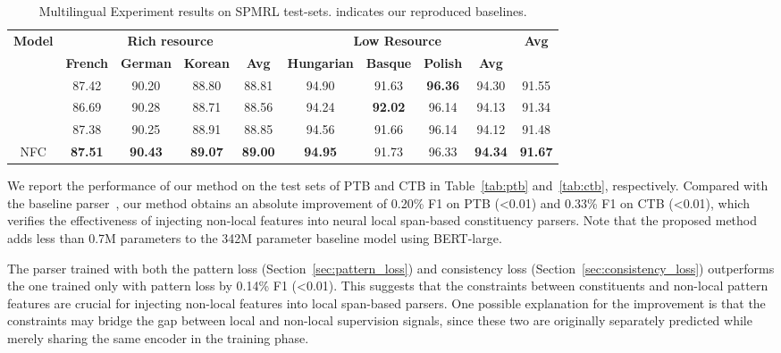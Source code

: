 \documentclass[11pt]{article}
\begin{document}
\begin{table*}[t!]
    \begin{center}
            \small
    \begin{tabular}{c|ccc|c|ccc|c|c}
        \hline
        \multirow{2}{*}{\bf Model} & \multicolumn{4}{c|}{\bf Rich resource} & \multicolumn{4}{c|}{\bf Low Resource} & \multirow{2}{*}{\bf Avg} \\
       \cline{2-9}
        & \bf French & \bf German & \bf Korean & \bf Avg & \bf Hungarian & \bf Basque & \bf Polish & \bf Avg & \\
        \hline
        \citet{san-constituency} & 87.42 & 90.20 & 88.80 & 88.81 & 94.90 & 91.63 & \bf 96.36 & 94.30 & 91.55 \\
         \citet{constituency-point} & 86.69 & 90.28 & 88.71 & 88.56 & 94.24  & \bf 92.02 & 96.14 & 94.13 & 91.34 \\
         \hline
        \citet{san-constituency}  & 87.38 & 90.25 & 88.91 & 88.85 & 94.56 & 91.66 & 96.14 & 94.12 & 91.48 \\
         NFC & \bf 87.51 & \bf 90.43 & \bf 89.07 & \bf 89.00 & \bf 94.95 & 91.73 & 96.33 & {\bf 94.34} &{\bf 91.67} \\
        \hline
    \end{tabular}
    \end{center}
    \caption{Multilingual Experiment results on SPMRL test-sets.  indicates our reproduced baselines.}
    \label{tab:multi-lingual}
\end{table*}


We report the performance of our method on the test sets of PTB and CTB in Table~\ref{tab:ptb} and~\ref{tab:ctb}, respectively. 
Compared with the baseline parser~\cite{san-constituency}, our method obtains an absolute improvement of 0.20\% F1 on PTB (\textless0.01) and 0.33\% F1 on CTB (\textless0.01), 
which verifies the effectiveness of injecting non-local features into neural local span-based constituency parsers. 
Note that the proposed method adds less than 0.7M parameters to the 342M parameter baseline model using \mbox{BERT-large}.

The parser trained with both the pattern loss (Section~\ref{sec:pattern_loss}) and consistency loss (Section~\ref{sec:consistency_loss}) outperforms the one trained only with pattern loss by 0.14\% F1 (\textless0.01). 
This suggests that the constraints between constituents and non-local pattern features are crucial for injecting non-local features into local span-based parsers. 
One possible explanation for the improvement is that the constraints may bridge the gap between local and non-local supervision signals, since these two are originally separately predicted while merely sharing the same encoder in the training phase.
\end{document}

